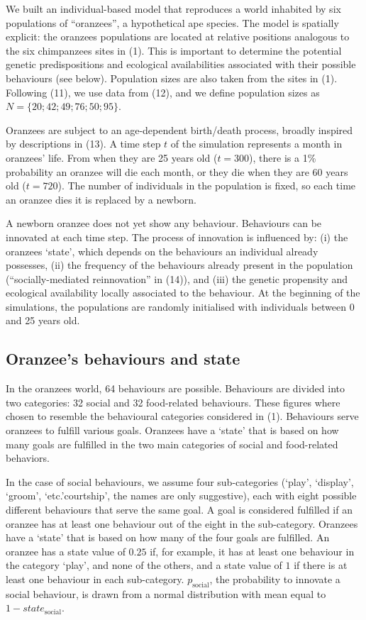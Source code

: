 \documentclass[9pt,twocolumn,twoside,]{pnas-new}
\begin{document}
We built an individual-based model that reproduces a world inhabited by
six populations of ``oranzees'', a hypothetical ape species. The model
is spatially explicit: the oranzees populations are located at relative
positions analogous to the six chimpanzees sites in (1). This is
important to determine the potential genetic predispositions and
ecological availabilities associated with their possible behaviours (see
below). Population sizes are also taken from the sites in (1). Following
(11), we use data from (12), and we define population sizes as
\(N=\{20;42;49;76;50;95\}\).

Oranzees are subject to an age-dependent birth/death process, broadly
inspired by descriptions in (13). A time step \(t\) of the simulation
represents a month in oranzees' life. From when they are 25 years old
(\(t=300\)), there is a 1\% probability an oranzee will die each month,
or they die when they are 60 years old (\(t=720\)). The number of
individuals in the population is fixed, so each time an oranzee dies it
is replaced by a newborn.

A newborn oranzee does not yet show any behaviour. Behaviours can be
innovated at each time step. The process of innovation is influenced by:
(i) the oranzees `state', which depends on the behaviours an individual
already possesses, (ii) the frequency of the behaviours already present
in the population (``socially-mediated reinnovation'' in (14)), and
(iii) the genetic propensity and ecological availability locally
associated to the behaviour. At the beginning of the simulations, the
populations are randomly initialised with individuals between 0 and 25
years old.

\subsection*{Oranzee's behaviours and state}\label{format}

In the oranzees world, 64 behaviours are possible. Behaviours are
divided into two categories: 32 social and 32 food-related behaviours.
These figures where chosen to resemble the behavioural categories
considered in (1). Behaviours serve oranzees to fulfill various goals.
Oranzees have a `state' that is based on how many goals are fulfilled in
the two main categories of social and food-related behaviors.

In the case of social behaviours, we assume four sub-categories (`play',
`display', `groom', `etc.'courtship', the names are only suggestive),
each with eight possible different behaviours that serve the same goal.
A goal is considered fulfilled if an oranzee has at least one behaviour
out of the eight in the sub-category. Oranzees have a `state' that is
based on how many of the four goals are fulfilled. An oranzee has a
state value of \(0.25\) if, for example, it has at least one behaviour
in the category `play', and none of the others, and a state value of
\(1\) if there is at least one behaviour in each sub-category.
\(p_\text{social}\), the probability to innovate a social behaviour, is
drawn from a normal distribution with mean equal to
\(1-state_\text{social}\).
\end{document}
